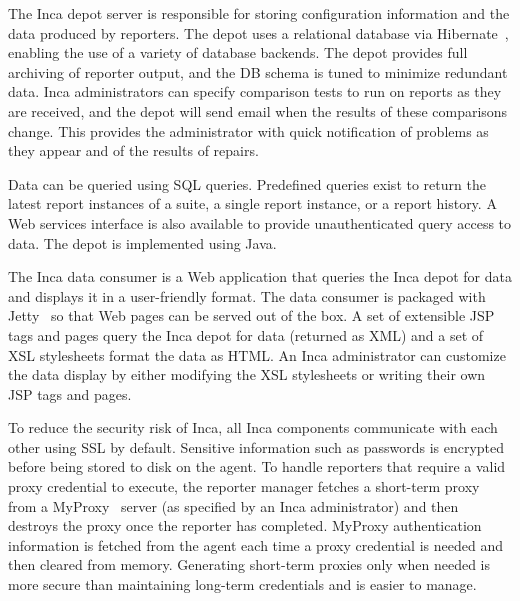 \documentclass[times,10pt,twocolumn]{article}
\begin{document}

The Inca depot server is responsible for storing configuration information and
the data produced by reporters. The depot uses a relational database via
Hibernate~\cite{hibernate}, enabling the use of a variety of database backends.
The depot provides full archiving of reporter output, and the DB schema is
tuned to minimize redundant data.  Inca administrators can specify comparison
tests to run on reports as they are received, and the depot will send email
when the results of these comparisons change.  This provides the administrator
with quick notification of problems as they appear and of the results of
repairs.

Data can be queried using SQL queries. Predefined queries exist to return the
latest report instances of a suite, a single report instance, or a report
history.  A Web services interface is also available to provide
unauthenticated query access to data.  The depot is implemented using Java.


The Inca data consumer is a Web application that queries the Inca depot for
data and displays it in a user-friendly format.  The data consumer is packaged
with Jetty~\cite{jetty} so that Web pages can be served out of the box.  A set
of extensible JSP tags and pages query the Inca depot for data (returned as
XML)
and a set of XSL stylesheets format the data as HTML.  An Inca administrator
can customize the data display by either modifying the XSL stylesheets or
writing their own JSP tags and pages.

\label{security}

To reduce the security risk of Inca, all Inca components communicate with each
other using SSL by default.  Sensitive information such as passwords is
encrypted before being stored to disk on the agent.  To handle reporters that
require a valid proxy credential to execute, the reporter manager fetches a
short-term proxy from a MyProxy~\cite{myproxy} server (as specified by an Inca
administrator) and then destroys the proxy once the reporter has completed.
MyProxy authentication information is fetched from the agent each time a proxy
credential is needed and then cleared from memory.  Generating short-term 
proxies only when needed is more secure than maintaining long-term
credentials and is easier to manage.

\end{document}
